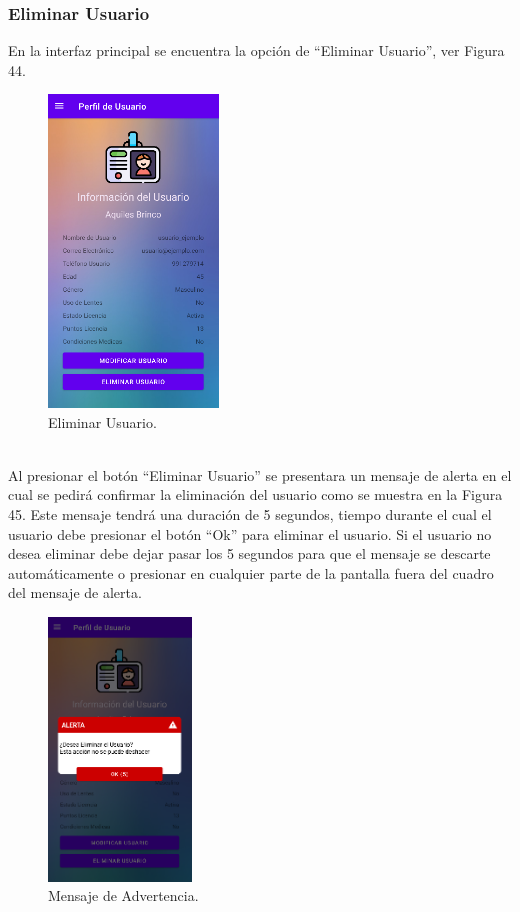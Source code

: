 \documentclass[a4paper,10pt, oneside, titlepage]{article}
\begin{document}
	\subsubsection{Eliminar Usuario}
	En la interfaz principal se encuentra la opción de ``Eliminar Usuario'', ver Figura 44. 
	\begin{figure}[!ht]
		\centering
		\includegraphics[width = 0.4\linewidth, height = 8.3cm]{44.png}
		\caption{Eliminar Usuario.}
	\end{figure}\\
	Al presionar el botón ``Eliminar Usuario'' se presentara un mensaje de alerta en el cual se pedirá confirmar la eliminación del usuario como se muestra en la Figura 45. Este mensaje tendrá una duración de 5 segundos, tiempo durante el cual el usuario debe presionar el botón ``Ok'' para eliminar el usuario. Si el usuario no desea eliminar debe dejar pasar los 5 segundos para que el mensaje se descarte automáticamente o presionar en cualquier parte de la pantalla fuera del cuadro del mensaje de alerta.
	\begin{figure}[!ht]
		\centering
		\includegraphics[width = 0.4\linewidth, height = 7cm]{45.png}
		\caption{Mensaje de Advertencia.}
	\end{figure}\\
\end{document}
